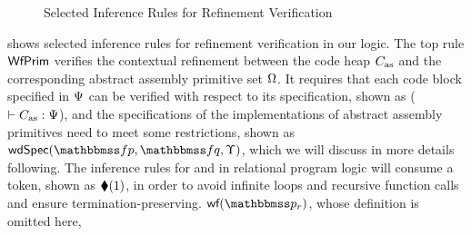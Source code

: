 \begin{figure*}[!t]
    \caption{Selected Inference Rules for Refinement Verification}
    \label{fig:Selected Inference Rules for Refinement Verification}
\end{figure*}
\Fig{\ref{fig:Selected Inference Rules for Refinement Verification}}
shows selected inference rules for refinement verification in our
logic. The top rule $\textsf{WfPrim}$ verifies the contextual refinement
between the code heap $C_{\text{as}}$ and the corresponding abstract assembly
primitive set $\Omega$. It requires that each code block specified
in $\Psi$ can be verified with respect to its specification,
shown as ($\vdash {C_{\text{as}}} : {\Psi}$), and the specifications
of the implementations of abstract assembly primitives need
to meet some restrictions, shown as $\wdSpec{\relspecpre}{\relspecpost}{\hprim}$,
which we will discuss in more details following.
The inference rules for \jmp{} and \call{} in
relational program logic will consume a token,
shown as $\blacklozenge({1})$, 
in order to avoid infinite loops and 
recursive function calls and ensure 
termination-preserving.
$\wfFrm(\relastP_r)$, whose definition is omitted here,
